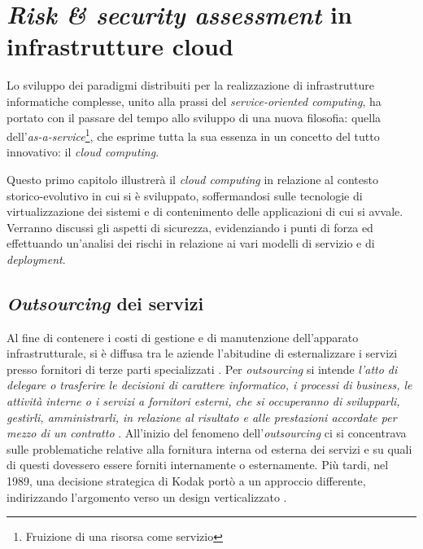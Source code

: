 \documentclass[../main.tex]{subfiles}
\begin{document}
\chapter{\textit{Risk \& security assessment} in infrastrutture cloud}
Lo sviluppo dei paradigmi distribuiti per la realizzazione di infrastrutture informatiche complesse, unito alla prassi del \textit{service-oriented computing}, ha portato con il passare del tempo allo sviluppo di una nuova filosofia: quella dell'\textit{as-a-service}\footnote{Fruizione di una risorsa come servizio}, che esprime tutta la sua essenza in un concetto del tutto innovativo: il \textit{cloud computing}.

Questo primo capitolo illustrerà il \textit{cloud computing} in relazione al contesto storico-evolutivo in cui si è sviluppato, soffermandosi sulle tecnologie di virtualizzazione dei sistemi e di contenimento delle applicazioni di cui si avvale.
Verranno discussi gli aspetti di sicurezza, evidenziando i punti di forza ed effettuando un'analisi dei rischi in relazione ai vari modelli di servizio e di \textit{deployment}.

\section{\textit{Outsourcing} dei servizi}
Al fine di contenere i costi di gestione e di manutenzione dell'apparato infrastrutturale, si è diffusa tra le aziende l'abitudine di esternalizzare i servizi presso fornitori di terze parti specializzati \cite{OutsourcingCloudDhardBalakrishnan}.
Per \textit{outsourcing} si intende \textit{l'atto di delegare o trasferire le decisioni di carattere informatico, i processi di business, le attività interne o i servizi a fornitori esterni, che si occuperanno di svilupparli, gestirli, amministrarli, in relazione al risultato e alle prestazioni accordate per mezzo di un contratto} \cite{OutsourcingCloudDhardBalakrishnan}.
All'inizio del fenomeno dell'\textit{outsourcing} ci si concentrava sulle problematiche relative alla fornitura interna od esterna dei servizi e su quali di questi dovessero essere forniti internamente o esternamente. Più tardi, nel 1989, una decisione strategica di Kodak portò a un approccio differente, indirizzando l'argomento verso un design verticalizzato \cite{OutsourcingCloud2}.
\end{document}

